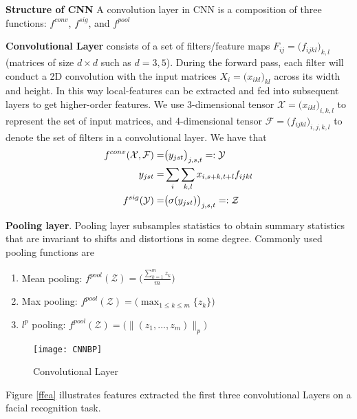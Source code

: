 {\bf Structure of CNN}
A convolution layer in CNN is a composition of three functions: $f^{conv}$, $f^{sig}$, and $f^{pool}$

{\bf Convolutional Layer} consists of a set of filters/feature maps $F_{ij} = \big(f_{ijkl}\big)_{k,l}$ (matrices of size $d\times d$ such as $d=3,5$). During the forward pass, each filter will conduct a 2D convolution with the input matrices $X_i=\big(x_{ikl}\big)_{kl}$ across its width and height. In this way local-features can be extracted and fed into subsequent layers to get higher-order features. We use 3-dimensional tensor $\mathcal{X}=\big(x_{ikl}\big)_{i,k,l}$ to represent the set of input matrices, and 4-dimensional tensor $\mathcal{F}=\big(f_{ijkl}\big)_{i,j,k,l}$ to denote the set of filters in a convolutional layer. We have that
\begin{equation}
\aligned
f^{conv}(\mathcal{X}, \mathcal{F}) =& \big(y_{jst}\big)_{j,s,t}=:\mathcal{Y}\\
y_{jst} =& \sum_i\sum_{k,l} x_{i,s+k, t+l}f_{ijkl}\\
f^{sig}(\mathcal{Y}) =& \big(\sigma(y_{jst})\big)_{j,s,t}=:\mathcal{Z}
\endaligned
\end{equation}

{\bf Pooling layer}. Pooling layer subsamples statistics to obtain summary statistics that are invariant to shifts and distortions in some degree. Commonly used pooling functions are
\begin{enumerate}
\item
Mean pooling: $f^{pool}(\mathcal{Z})=\big(\frac{\sum_{k=1}^m z_k}{m}\big)$
\item
Max pooling: $f^{pool}(\mathcal{Z})=\big(\max_{1\le k\le m}\{z_k\}\big)$
\item
$l^p$ pooling: $f^{pool}(\mathcal{Z})=\big(\|(z_1,...,z_m)\|_p\big)$
\end{enumerate}


\begin{figure}[ht]\label{fcnnbp}
\texttt{[image: CNNBP]}
\caption{Convolutional Layer}
\end{figure}

Figure \ref{ffea} illustrates features extracted the first three convolutional Layers  on a facial recognition task.

